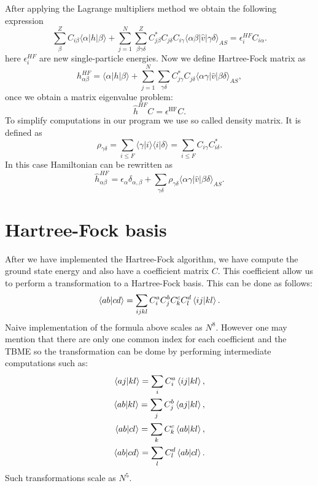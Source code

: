 \documentclass[twoside,english]{uiofysmaster}
\theoremstyle{definition}
\begin{document}
After applying the Lagrange multipliers method we obtain the following expression
\begin{equation}
\sum_{\beta}^Z C_{i\beta}\langle \alpha | h | \beta \rangle+
\sum_{j=1}^N\sum_{\beta\gamma\delta}^Z C^*_{j\beta}C_{j\delta}C_{i\gamma}\langle \alpha\beta|\hat{v}|\gamma\delta\rangle_{AS}=\epsilon_i^{HF}C_{i\alpha}.
\end{equation}
here $\epsilon_i^{HF}$ are new single-particle energies. Now we define Hartree-Fock matrix as
\begin{equation}
h_{\alpha\beta}^{HF}=\langle \alpha | h | \beta \rangle+
\sum_{j=1}^N\sum_{\gamma\delta} C^*_{j\gamma}C_{j\delta}\langle \alpha\gamma|\hat{v}|\beta\delta\rangle_{AS},
\end{equation}
once we obtain a matrix eigenvalue problem:
\begin{equation} \label{eig}
\hat{h}^{HF}C=\epsilon^{\mathrm{HF}}C.
\end{equation}
To simplify computations in our program we use so called density matrix. It is defined as
\begin{equation} \label{dens}
\rho_{\gamma\delta}=\sum_{i\le F}\langle\gamma|i\rangle\langle i|\delta\rangle = \sum_{i\le F}C_{i\gamma}C^*_{i\delta}.
\end{equation}
In this case Hamiltonian can be rewritten as 
\begin{equation}
\hat{h}_{\alpha\beta}^{HF}=\epsilon_{\alpha}\delta_{\alpha,\beta}+
\sum_{\gamma\delta} \rho_{\gamma\delta}\langle \alpha\gamma|\hat{v}|\beta\delta\rangle_{AS}.
\end{equation}
\section{Hartree-Fock basis}
After we have implemented the Hartree-Fock algorithm, we have compute the ground state energy and also have a coefficient matrix $C$. This coefficient allow us to perform a transformation to a Hartree-Fock basis. This can be done as follows:
\begin{equation}
\braket{ab|cd}=\sum_{ijkl}C_i^aC_j^bC_k^cC_l^d \braket{ij|kl}.
\end{equation}
Naive implementation of the formula above scales as $N^8$.
However one may mention that there are only one common index for each coefficient and the TBME so the transformation can be dome  by performing intermediate computations such as:
\begin{align}
\braket{aj|kl}=\sum_{i}C_i^a \braket{ij|kl},\\
\braket{ab|kl}=\sum_{j}C_j^b \braket{aj|kl},\\
\braket{ab|cl}=\sum_{k}C_k^c \braket{ab|kl},\\
\braket{ab|cd}=\sum_{l}C_l^d \braket{ab|cl}.
\end{align} 
Such transformations scale as $N^5$.
\end{document}
